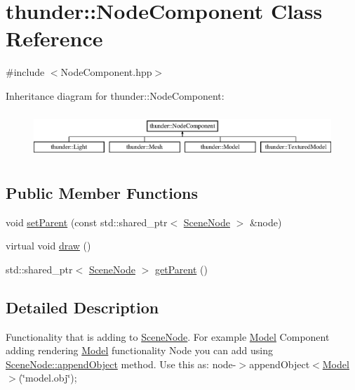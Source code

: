 \hypertarget{classthunder_1_1_node_component}{}\section{thunder\+:\+:Node\+Component Class Reference}
\label{classthunder_1_1_node_component}


{\ttfamily \#include $<$Node\+Component.\+hpp$>$}

Inheritance diagram for thunder\+:\+:Node\+Component\+:\begin{figure}[H]
\begin{center}
\leavevmode
\includegraphics[height=1.728395cm]{classthunder_1_1_node_component}
\end{center}
\end{figure}
\subsection*{Public Member Functions}
\begin{DoxyCompactItemize}
\item 
void \mbox{\hyperlink{classthunder_1_1_node_component_a9394ae349cc06fcc766d9fcfe19322fd}{set\+Parent}} (const std\+::shared\+\_\+ptr$<$ \mbox{\hyperlink{classthunder_1_1_scene_node}{Scene\+Node}} $>$ \&node)
\item 
virtual void \mbox{\hyperlink{classthunder_1_1_node_component_a1edbd50e6595a2ad181d14683c98f405}{draw}} ()
\item 
std\+::shared\+\_\+ptr$<$ \mbox{\hyperlink{classthunder_1_1_scene_node}{Scene\+Node}} $>$ \mbox{\hyperlink{classthunder_1_1_node_component_a09ca8c3f24e4a4e2df6b9f8e81b3504f}{get\+Parent}} ()
\end{DoxyCompactItemize}


\subsection{Detailed Description}
Functionality that is adding to \mbox{\hyperlink{classthunder_1_1_scene_node}{Scene\+Node}}. For example \mbox{\hyperlink{classthunder_1_1_model}{Model}} Component adding rendering \mbox{\hyperlink{classthunder_1_1_model}{Model}} functionality Node you can add using \mbox{\hyperlink{classthunder_1_1_scene_node_a2a45fdece02c7ae3ae62805054f63ae1}{Scene\+Node\+::append\+Object}} method. Use this as\+: {\ttfamily node-\/$>$append\+Object$<$\mbox{\hyperlink{classthunder_1_1_model}{Model}}$>$(\char`\"{}model.\+obj\char`\"{});} 


